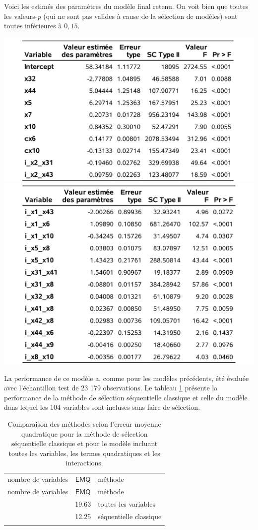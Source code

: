 \documentclass[
  11pt,
  letterpaper,
]{book}
\theoremstyle{definition}
\theoremstyle{definition}
\theoremstyle{definition}
\theoremstyle{remark}
\begin{document}
Voici les estimés des paramètres du modèle final retenu. On voit bien que toutes les valeurs-\emph{p} (qui ne sont pas valides à cause de la sélection de modèles) sont toutes inférieures à \(0,15\).

\begin{center}\includegraphics[width=0.7\linewidth]{figures/02-select-e10} \includegraphics[width=0.7\linewidth]{figures/02-select-e11} \end{center}

La performance de ce modèle a, comme pour les modèles précédents, été évaluée avec l'échantillon test de 23 179 observations. Le tableau \ref{tab:02-comparaisonseqclas} présente la performance de la méthode de sélection séquentielle classique et celle du modèle dans lequel les 104 variables sont incluses sans faire de sélection.

\begin{longtable}[]{@{}ccl@{}}
\caption{\label{tab:02-comparaisonseqclas} Comparaison des méthodes selon l'erreur moyenne quadratique pour la méthode de sélection séquentielle classique et pour le modèle incluant toutes les variables, les termes quadratiques et les interactions.}\tabularnewline
\toprule
nombre de variables & \(\mathsf{EMQ}\) & méthode \\ \addlinespace
\midrule
\endfirsthead
\toprule
nombre de variables & \(\mathsf{EMQ}\) & méthode \\ \addlinespace
\midrule
\endhead
104 & 19.63 & toutes les variables \\ \addlinespace
22 & 12.25 & séquentielle classique \\ \addlinespace
\bottomrule
\end{longtable}
\end{document}
